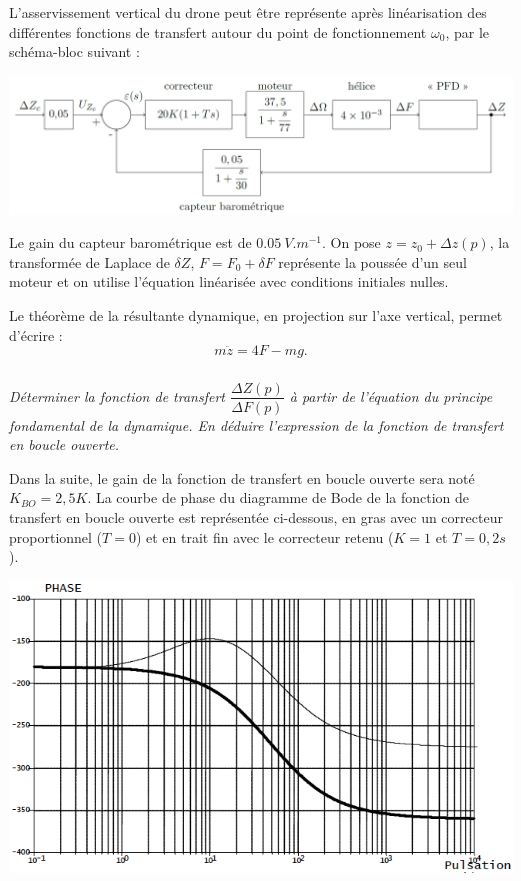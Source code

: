 \documentclass[10pt,fleqn]{article} %
\begin{document}
\begin{multicols}{2}
L'asservissement vertical du drone peut être représente après linéarisation des différentes fonctions de
transfert autour du point de fonctionnement $\omega_0$, par le schéma-bloc suivant :

\begin{center}
\includegraphics[width=\linewidth]{images/fig_06}
\end{center}



Le gain du capteur barométrique est de $\SI{0,05}{V.m^{-1}}$. On pose $z=z_0+\Delta z(p)$, la transformée de Laplace de $\delta Z$, $F=F_0 + \delta F$ représente la poussée d'un seul moteur et on utilise l'équation linéarisée avec conditions initiales nulles.

Le théorème de la résultante dynamique, en projection sur l’axe vertical, permet d’écrire :
$$ m\ddot{z} =4F-mg. $$


\subparagraph{}\textit{Déterminer la fonction de transfert $\dfrac{\Delta Z(p)}{\Delta F(p)}$ à partir de l'équation du principe fondamental de la dynamique. En déduire l'expression de la fonction de transfert en boucle ouverte. }


Dans la suite, le gain de la fonction de transfert en boucle ouverte sera noté $K_{BO}=2,5 K$.
La courbe de phase du diagramme de Bode de la fonction de transfert en boucle ouverte est représentée ci-dessous, en gras avec un correcteur proportionnel ($T=0$) et en trait fin avec le correcteur retenu ($K=1$ et $T=0,2s$).


\begin{center}
\includegraphics[width=\linewidth]{images/fig_07}
\end{center}



\end{multicols}
\end{document}
